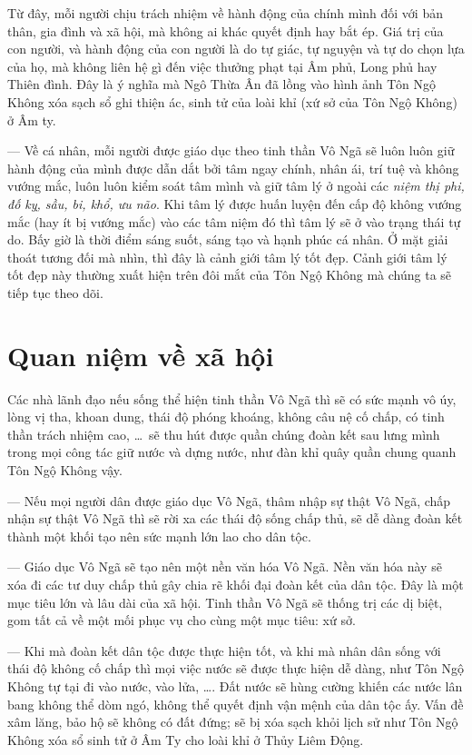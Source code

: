 Từ đây, mỗi người chịu trách nhiệm về hành động của chính mình đối với bản thân, gia đình và xã hội, mà không ai khác quyết định hay bắt ép. Giá trị của con người, và hành động của con người là do tự giác, tự nguyện và tự do chọn lựa của họ, mà không liên hệ gì đến việc thưởng phạt tại Âm phủ, Long phủ hay Thiên đình. Đây là ý nghĩa mà Ngô Thừa Ân đã lồng vào hình ảnh Tôn Ngộ Không xóa sạch sổ ghi thiện ác, sinh tử của loài khỉ (xứ sở của Tôn Ngộ Không) ở Âm ty.

— Về cá nhân, mỗi người được giáo dục theo tinh thần Vô Ngã sẽ luôn luôn giữ hành động của mình được dẫn dắt bởi tâm ngay chính, nhân ái, trí tuệ và không vướng mắc, luôn luôn kiểm soát tâm mình và giữ tâm lý ở ngoài các \emph{niệm thị phi, đố kỵ, sầu, bi, khổ, ưu não}. Khi tâm lý được huấn luyện đến cấp độ không vướng mắc (hay ít bị vướng mắc) vào các tâm niệm đó thì tâm lý sẽ ở vào trạng thái tự do. Bấy giờ là thời điểm sáng suốt, sáng tạo và hạnh phúc cá nhân. Ở mặt giải thoát tương đối mà nhìn, thì đây là cảnh giới tâm lý tốt đẹp. Cảnh giới tâm lý tốt đẹp này thường xuất hiện trên đôi mắt của Tôn Ngộ Không mà chúng ta sẽ tiếp tục theo dõi.


\section{Quan niệm về xã hội} %
\label{sec:3_xa_hoi}

Các nhà lãnh đạo nếu sống thể hiện tinh thần Vô Ngã thì sẽ có sức mạnh vô úy, lòng vị tha, khoan dung, thái độ phóng khoáng, không câu nệ cố chấp, có tinh thần trách nhiệm cao, \ldots ~sẽ thu hút được quần chúng đoàn kết sau lưng mình trong mọi công tác giữ nước và dựng nước, như đàn khỉ quây quần chung quanh Tôn Ngộ Không vậy.

— Nếu mọi người dân được giáo dục Vô Ngã, thâm nhập sự thật Vô Ngã, chấp nhận sự thật Vô Ngã thì sẽ rời xa các thái độ sống chấp thủ, sẽ dễ dàng đoàn kết thành một khối tạo nên sức mạnh lớn lao cho dân tộc.

— Giáo dục Vô Ngã sẽ tạo nên một nền văn hóa Vô Ngã. Nền văn hóa này sẽ xóa đi các tư duy chấp thủ gây chia rẽ khối đại đoàn kết của dân tộc. Đây là một mục tiêu lớn và lâu dài của xã hội. Tinh thần Vô Ngã sẽ thống trị các dị biệt, gom tất cả về một mối phục vụ cho cùng một mục tiêu: xứ sở.

— Khi mà đoàn kết dân tộc được thực hiện tốt, và khi mà nhân dân sống với thái độ không cố chấp thì mọi việc nước sẽ được thực hiện dễ dàng, như Tôn Ngộ Không tự tại đi vào nước, vào lửa, \ldots. Đất nước sẽ hùng cường khiến các nước lân bang không thể dòm ngó, không thể quyết định vận mệnh của dân tộc ấy. Vấn đề xâm lăng, bảo hộ sẽ không có đất đứng; sẽ bị xóa sạch khỏi lịch sử như Tôn Ngộ Không xóa sổ sinh tử ở Âm Ty cho loài khỉ ở Thủy Liêm Động.

